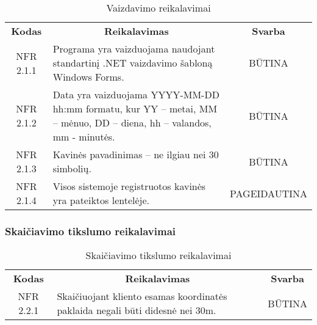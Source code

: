 \documentclass{VUMIFPSkursinis}
\begin{document}
\begin{center}
	\begin{table}[H]
	\begin{tabular}{|p{2cm}|p{}|p{}|}
	\hline
	    \rowcolor{lightgray}
		\multicolumn{3}{|c|}{Vaizdavimo reikalavimai}\\
		
	\hline
		\multicolumn{1}{|c|}{{\bfseries Kodas}}&
		\multicolumn{1}{|c|}{{\bfseries Reikalavimas}}&
		\multicolumn{1}{|c|}{{\bfseries Svarba}}\\
	\hline 	
		\multicolumn{1}{|c|}{NFR 2.1.1}&
		{Programa yra vaizduojama naudojant standartinį .NET vaizdavimo šabloną Windows Forms.}&
		\multicolumn{1}{|c|}{BŪTINA}\\	
	
	\hline 	
		\multicolumn{1}{|c|}{NFR 2.1.2}&
		{Data yra vaizduojama YYYY-MM-DD hh:mm formatu, kur YY – metai, MM – mėnuo, DD – diena, hh – valandos, mm - minutės.}&
		\multicolumn{1}{|c|}{BŪTINA}\\	
	
	\hline 	
		\multicolumn{1}{|c|}{NFR 2.1.3}&
		{Kavinės pavadinimas – ne ilgiau nei 30 simbolių.}&
		\multicolumn{1}{|c|}{BŪTINA}\\	
	
	\hline  	
		\multicolumn{1}{|c|}{NFR 2.1.4}&
		{Visos sistemoje registruotos kavinės yra pateiktos lentelėje.}&
		\multicolumn{1}{|p{1.5cm}|}{PAGEIDAUTINA}\\		
	
	\hline 	 	 	
	\end{tabular}
	\caption{Vaizdavimo reikalavimai}
	\label{table:Vaizdavimoreikalavimai}
	\end{table}

\end{center}

\subsubsection{Skaičiavimo tikslumo reikalavimai}

\begin{center}
	\begin{table}[H]
	\begin{tabular}{|p{2cm}|p{}|p{}|}
	\hline
	    \rowcolor{lightgray}
		\multicolumn{3}{|c|}{Skaičiavimo tikslumo reikalavimai}\\
		
	\hline
		\multicolumn{1}{|c|}{{\bfseries Kodas}}&
		\multicolumn{1}{|c|}{{\bfseries Reikalavimas}}&
		\multicolumn{1}{|c|}{{\bfseries Svarba}}\\
	\hline 	
		\multicolumn{1}{|c|}{NFR 2.2.1}&
		{Skaičiuojant kliento esamas koordinatės paklaida negali būti didesnė nei 30m.}&
		\multicolumn{1}{|c|}{BŪTINA}\\	
	\hline 	 	 	
	\end{tabular}
	\caption{Skaičiavimo tikslumo reikalavimai}
	\label{table:Skaičiavimotikslumoreikalavimai}
	\end{table}

\end{center}
\end{document}
